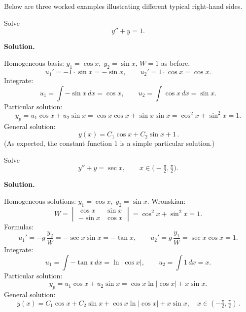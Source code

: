     \vspace{6pt}
    Below are three worked examples illustrating different typical right-hand sides.



    \begin{example}

      Solve
      \[
        y''+y=1.
      \]

      \textbf{Solution.}

      Homogeneous basis: $y_1=\cos x,\; y_2=\sin x$, $W=1$ as before.
      \[
        u_1' = -1\cdot \sin x = -\sin x,\qquad u_2' = 1\cdot \cos x = \cos x.
      \]
      Integrate:
      \[
        u_1 = \int -\sin x\,dx = \cos x,\qquad u_2=\int \cos x\,dx = \sin x.
      \]
      Particular solution:
      \[
        y_p = u_1\cos x + u_2\sin x = \cos x\cos x + \sin x\sin x = \cos^2 x + \sin^2 x = 1.
      \]
      General solution:
      \[
        \boxed{\,y(x)=C_1\cos x + C_2\sin x + 1\, .}
      \]
      (As expected, the constant function $1$ is a simple particular solution.)
    \end{example}



    \begin{example}

      Solve
      \[
        y''+y=\sec x,\qquad x\in\big(-\tfrac{\pi}{2},\tfrac{\pi}{2}\big).
      \]

      \textbf{Solution.}
      
      Homogeneous solutions: $y_1=\cos x,\; y_2=\sin x$. Wronskian:
      \[
        W=\begin{vmatrix}\cos x & \sin x\\ -\sin x & \cos x\end{vmatrix}=\cos^2 x+\sin^2 x=1.
      \]
      Formulas:
      \[
        u_1' = -g\,\frac{y_2}{W} = -\sec x\sin x = -\tan x,\qquad
        u_2' = g\,\frac{y_1}{W} = \sec x\cos x = 1.
      \]
      Integrate:
      \[
        u_1 = \int -\tan x\,dx = \ln|\cos x|,\qquad u_2 = \int 1\,dx = x.
      \]
      Particular solution:
      \[
        y_p = u_1\cos x + u_2\sin x = \cos x\ln|\cos x| + x\sin x.
      \]
      General solution:
      \[
        \boxed{\,y(x) = C_1\cos x + C_2\sin x + \cos x\ln|\cos x| + x\sin x,\quad x\in(-\tfrac{\pi}{2},\tfrac{\pi}{2})\,.}
      \]
    \end{example}


